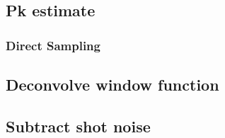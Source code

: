 \documentclass{article}
\begin{document}
\subsection{Pk estimate}

\subsubsection*{Direct Sampling}



\subsection{Deconvolve window function}

\subsection{Subtract shot noise}


\end{document}
